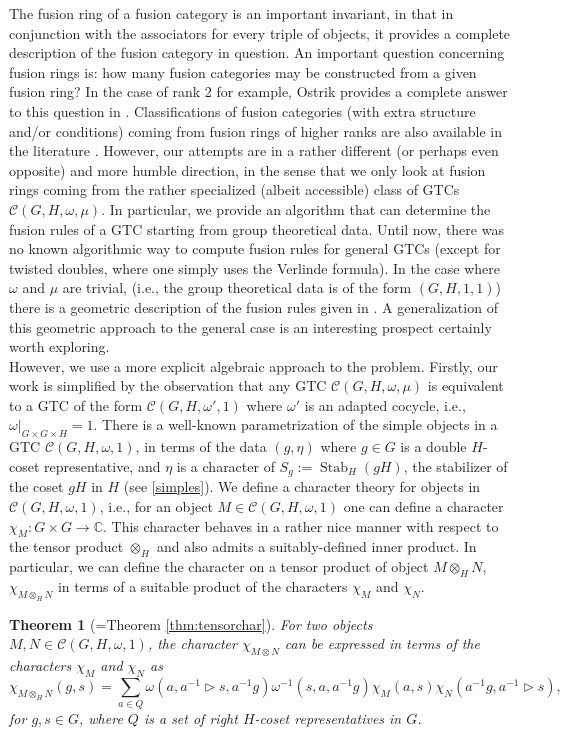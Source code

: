 \documentclass[a4paper, 10pt]{book}
\newtheorem{Thm}{Theorem}[chapter]
\theoremstyle{definition}
\numberwithin{equation}{chapter}
\newcommand\hit{\triangleright}
\newcommand\inv{^{-1}}
\newcommand\ot{\otimes}
\newcommand\Stab{\operatorname{Stab}}
\newcommand\kk{\mathbb C}
\newcommand\C{\mathcal C}
\newcommand{\ra}\rightarrow
\begin{document}
The fusion ring of a fusion category is an important invariant, in that in conjunction with the associators for every triple of objects, it provides a complete description of the fusion category in question. An important question concerning fusion rings is: how many fusion categories may be constructed from a given fusion ring? In the case of rank 2 for example, Ostrik provides a complete answer to this question in \cite{O}. Classifications of fusion categories (with extra structure and/or conditions) coming from fusion rings of higher ranks are also available in the literature \cite{MR2422269,MR3427429}. However, our attempts are in a rather different (or perhaps even opposite) and more humble direction, in the sense that we only look at fusion rings coming from the rather specialized (albeit accessible) class of GTCs $\C(G, H, \omega, \mu)$. In particular, we provide an algorithm that can determine the fusion rules of a GTC starting from group theoretical data. Until now, there was no known algorithmic way to compute fusion rules for general GTCs (except for twisted doubles, where one simply uses the Verlinde formula). In the case where $\omega$ and $\mu$ are trivial, (i.e., the group theoretical data is of the form $(G, H, 1, 1)$) there is a geometric description of the fusion rules given in \cite{MR1444783}. A generalization of this geometric approach to the general case is an interesting prospect certainly worth exploring.\\
However, we use a more explicit algebraic approach to the problem. Firstly, our work is simplified by the observation that any GTC $\C(G, H, \omega, \mu)$ is equivalent to a GTC of the form $\C(G, H, \omega', 1)$ where $\omega'$ is an adapted cocycle, i.e., $\omega|_{G\times G \times H}= 1$. There is a well-known parametrization of the simple objects in a GTC $\C(G, H, \omega, 1)$, in terms of the data $(g, \eta)$ where $g\in G$ is a double $H$-coset representative, and $\eta$ is a character of $S_g:= \Stab_H(gH)$, the stabilizer of the coset $gH$ in $H$ (see \ref{simples}). We define a character theory for objects in $\C(G, H, \omega, 1)$, i.e., for an object $M\in \C(G, H, \omega, 1)$ one can define a character $\chi_M:G\times G\ra \kk$. This character behaves in a rather nice manner with respect to the tensor product $\otimes_H$ and also admits a suitably-defined inner product. In particular, we can define the character on a tensor product of object $M\ot_H N$, $\chi_{M\ot_H N}$ in terms of a suitable product of the characters $\chi_M$ and $\chi_N$. 
\begin{Thm}[=Theorem \ref{thm:tensorchar}]
For two objects $M, N \in \C(G, H, \omega, 1)$, the character $\chi_{M\ot N}$ can be expressed in terms of the characters $\chi_M$ and $\chi_N$ as  
\begin{equation*}
	\chi_{M\otimes_H N }(g,s) = \sum_{a\in Q} \omega(a, a\inv \hit s, a\inv g)\omega\inv(s,a, a\inv g) \chi_{M}(a,s)\chi_{N}(a\inv g, a\inv \hit s ),
\end{equation*} for $g, s\in G$, where $Q$ is a set of right $H$-coset representatives in $G$.
\end{Thm}
\end{document}
